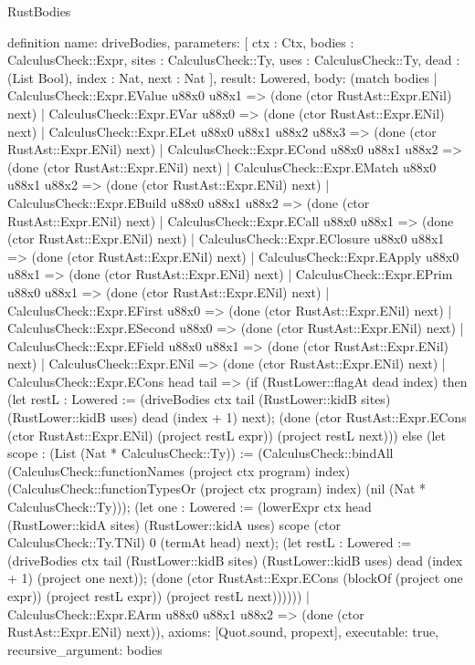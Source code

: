 \begin{lexlean}{RustBodies}
\begin{semanticmodule}
definition{
  name: driveBodies,
  parameters: [
    ctx : Ctx,
    bodies : CalculusCheck::Expr,
    sites : CalculusCheck::Ty,
    uses : CalculusCheck::Ty,
    dead : (List Bool),
    index : Nat,
    next : Nat
  ],
  result: Lowered,
  body: (match bodies
    | CalculusCheck::Expr.EValue u88x0 u88x1 => (done (ctor RustAst::Expr.ENil) next)
    | CalculusCheck::Expr.EVar u88x0 => (done (ctor RustAst::Expr.ENil) next)
    | CalculusCheck::Expr.ELet u88x0 u88x1 u88x2 u88x3 => (done (ctor RustAst::Expr.ENil) next)
    | CalculusCheck::Expr.ECond u88x0 u88x1 u88x2 => (done (ctor RustAst::Expr.ENil) next)
    | CalculusCheck::Expr.EMatch u88x0 u88x1 u88x2 => (done (ctor RustAst::Expr.ENil) next)
    | CalculusCheck::Expr.EBuild u88x0 u88x1 u88x2 => (done (ctor RustAst::Expr.ENil) next)
    | CalculusCheck::Expr.ECall u88x0 u88x1 => (done (ctor RustAst::Expr.ENil) next)
    | CalculusCheck::Expr.EClosure u88x0 u88x1 => (done (ctor RustAst::Expr.ENil) next)
    | CalculusCheck::Expr.EApply u88x0 u88x1 => (done (ctor RustAst::Expr.ENil) next)
    | CalculusCheck::Expr.EPrim u88x0 u88x1 => (done (ctor RustAst::Expr.ENil) next)
    | CalculusCheck::Expr.EFirst u88x0 => (done (ctor RustAst::Expr.ENil) next)
    | CalculusCheck::Expr.ESecond u88x0 => (done (ctor RustAst::Expr.ENil) next)
    | CalculusCheck::Expr.EField u88x0 u88x1 => (done (ctor RustAst::Expr.ENil) next)
    | CalculusCheck::Expr.ENil => (done (ctor RustAst::Expr.ENil) next)
    | CalculusCheck::Expr.ECons head tail => (if (RustLower::flagAt dead index) then (let restL : Lowered := (driveBodies ctx tail (RustLower::kidB sites) (RustLower::kidB uses) dead (index + 1) next); (done (ctor RustAst::Expr.ECons (ctor RustAst::Expr.ENil) (project restL expr)) (project restL next))) else (let scope : (List (Nat * CalculusCheck::Ty)) := (CalculusCheck::bindAll (CalculusCheck::functionNames (project ctx program) index) (CalculusCheck::functionTypesOr (project ctx program) index) (nil (Nat * CalculusCheck::Ty))); (let one : Lowered := (lowerExpr ctx head (RustLower::kidA sites) (RustLower::kidA uses) scope (ctor CalculusCheck::Ty.TNil) 0 (termAt head) next); (let restL : Lowered := (driveBodies ctx tail (RustLower::kidB sites) (RustLower::kidB uses) dead (index + 1) (project one next)); (done (ctor RustAst::Expr.ECons (blockOf (project one expr)) (project restL expr)) (project restL next))))))
    | CalculusCheck::Expr.EArm u88x0 u88x1 u88x2 => (done (ctor RustAst::Expr.ENil) next)),
  axioms: [Quot.sound, propext],
  executable: true,
  recursive_argument: bodies
}


\end{semanticmodule}
\end{lexlean}
